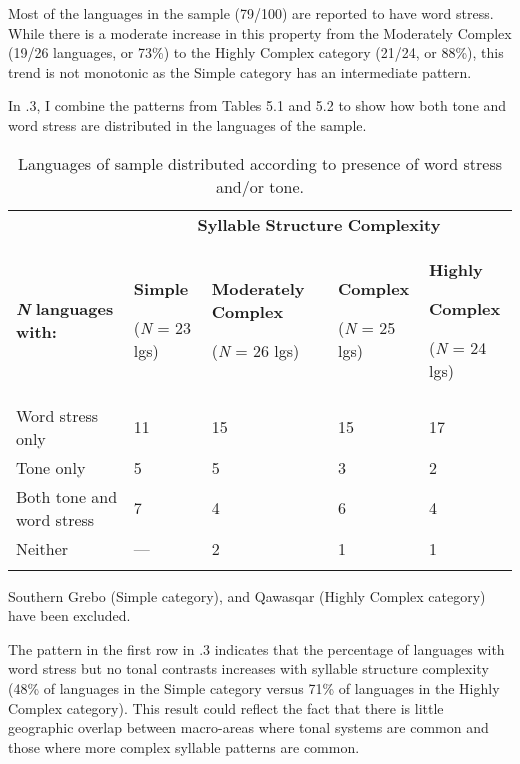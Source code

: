   Most of the languages in the sample (79/100) are reported to have word stress. While there is a moderate increase in this property from the Moderately Complex (19/26 languages, or 73\%) to the Highly Complex category (21/24, or 88\%), this trend is not monotonic as the Simple category has an intermediate pattern.



  In .3, I combine the patterns from Tables 5.1 and 5.2 to show how both tone and word stress are distributed in the languages of the sample.






\begin{table}
\begin{tabularx}{\textwidth}{XXXXX}
\lsptoprule
 & \multicolumn{4}{c}{ \textbf{Syllable} \textbf{Structure} \textbf{Complexity}}\\
 \textbf{\textit{N}} \textbf{languages} \textbf{with:} & { \textbf{Simple}}

 (\textit{N} = 23 lgs) & { \textbf{Moderately} \textbf{Complex}}

 (\textit{N} = 26 lgs) & { \textbf{Complex}}

 (\textit{N} = 25 lgs) & { \textbf{Highly} }

{ \textbf{Complex}}

 (\textit{N} = 24 lgs)\\
 Word stress only & 11 & 15 & 15 & 17\\
 Tone only & 5 & 5 & 3 & 2\\
 Both tone and word stress & 7 & 4 & 6 & 4\\
 Neither & — & 2 & 1 & 1\\
\lspbottomrule
\end{tabularx}
\caption{\label{5.3}Languages of sample distributed according to presence of word stress and/or tone.}Southern Grebo (Simple category), and Qawasqar (Highly Complex category) have been excluded.
\end{table}




  The pattern in the first row in .3 indicates that the percentage of languages with word stress but no tonal contrasts increases with syllable structure complexity (48\% of languages in the Simple category versus 71\% of languages in the Highly Complex category). This result could reflect the fact that there is little geographic overlap between macro-areas where tonal systems are common and those where more complex syllable patterns are common.



